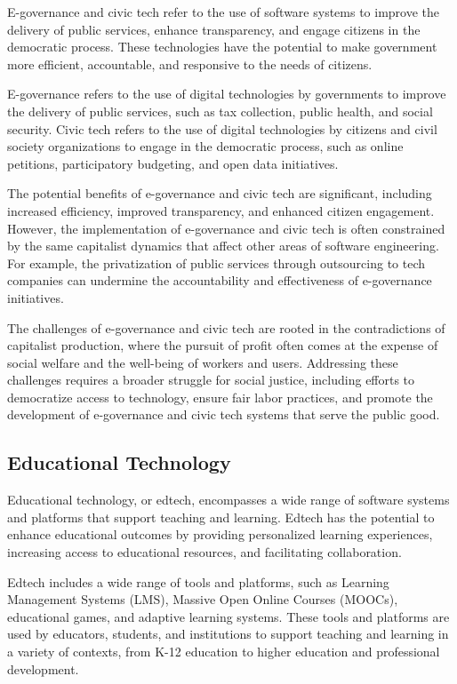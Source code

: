 \begin{refsection}
\begin{multicols}{2}
{E-governance and civic tech refer to the use of software systems to improve the delivery of public services, enhance transparency, and engage citizens in the democratic process. These technologies have the potential to make government more efficient, accountable, and responsive to the needs of citizens.

E-governance refers to the use of digital technologies by governments to improve the delivery of public services, such as tax collection, public health, and social security. Civic tech refers to the use of digital technologies by citizens and civil society organizations to engage in the democratic process, such as online petitions, participatory budgeting, and open data initiatives.

The potential benefits of e-governance and civic tech are significant, including increased efficiency, improved transparency, and enhanced citizen engagement. However, the implementation of e-governance and civic tech is often constrained by the same capitalist dynamics that affect other areas of software engineering. For example, the privatization of public services through outsourcing to tech companies can undermine the accountability and effectiveness of e-governance initiatives.

The challenges of e-governance and civic tech are rooted in the contradictions of capitalist production, where the pursuit of profit often comes at the expense of social welfare and the well-being of workers and users. Addressing these challenges requires a broader struggle for social justice, including efforts to democratize access to technology, ensure fair labor practices, and promote the development of e-governance and civic tech systems that serve the public good.

\subsection{Educational Technology}

Educational technology, or edtech, encompasses a wide range of software systems and platforms that support teaching and learning. Edtech has the potential to enhance educational outcomes by providing personalized learning experiences, increasing access to educational resources, and facilitating collaboration.

Edtech includes a wide range of tools and platforms, such as Learning Management Systems (LMS), Massive Open Online Courses (MOOCs), educational games, and adaptive learning systems. These tools and platforms are used by educators, students, and institutions to support teaching and learning in a variety of contexts, from K-12 education to higher education and professional development.

}
\end{multicols}
\end{refsection}
